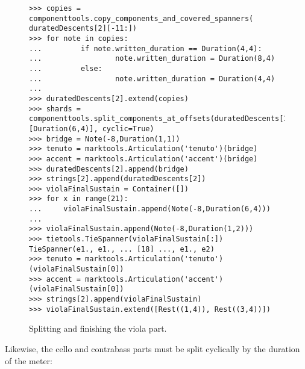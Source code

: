 \begin{figure}[H] 
\begin{lstlisting}[basicstyle=\scriptsize\ttfamily, breaklines=True, tabsize=4, showtabs=false, showspaces=false]
>>> copies = componenttools.copy_components_and_covered_spanners( duratedDescents[2][-11:])
>>> for note in copies:
... 		if note.written_duration == Duration(4,4):
... 				note.written_duration = Duration(8,4)
... 		else:
... 				note.written_duration = Duration(4,4)
... 
>>> duratedDescents[2].extend(copies)
>>> shards = componenttools.split_components_at_offsets(duratedDescents[2].leaves, [Duration(6,4)], cyclic=True)
>>> bridge = Note(-8,Duration(1,1))
>>> tenuto = marktools.Articulation('tenuto')(bridge)
>>> accent = marktools.Articulation('accent')(bridge)
>>> duratedDescents[2].append(bridge)
>>> strings[2].append(duratedDescents[2])
>>> violaFinalSustain = Container([])
>>> for x in range(21):
... 	violaFinalSustain.append(Note(-8,Duration(6,4)))
... 
>>> violaFinalSustain.append(Note(-8,Duration(1,2)))
>>> tietools.TieSpanner(violaFinalSustain[:])
TieSpanner(e1., e1., ... [18] ..., e1., e2)
>>> tenuto = marktools.Articulation('tenuto')(violaFinalSustain[0])
>>> accent = marktools.Articulation('accent')(violaFinalSustain[0])
>>> strings[2].append(violaFinalSustain)
>>> violaFinalSustain.extend([Rest((1,4)), Rest((3,4))])\end{lstlisting}

\caption{Splitting and finishing the viola part. } 
\end{figure}

Likewise, the cello and contrabass parts must be split cyclically by the duration of the meter:

